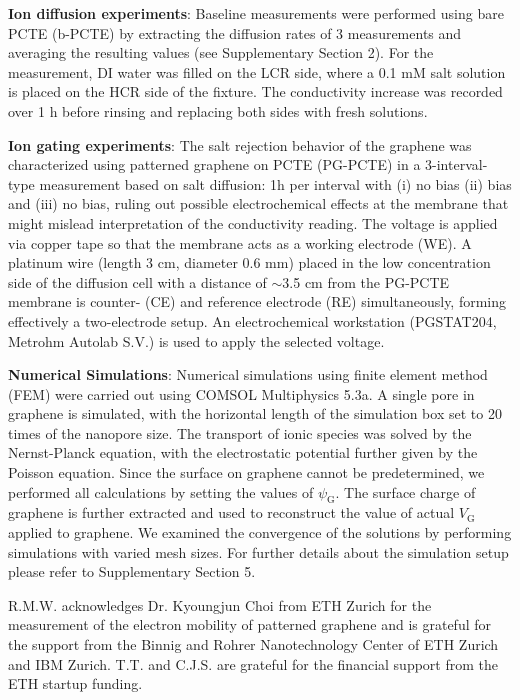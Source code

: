 \documentclass[journal=langd5,email=true, hyperref=true, keywords=false]{achemso}
\begin{document}
\vspace{1em}
\noindent
\textbf{Ion diffusion experiments}: Baseline measurements were
performed using bare PCTE (b-PCTE) by extracting the diffusion rates
of 3 measurements and averaging the resulting values (see
Supplementary Section 2). For the measurement, DI water was filled on
the LCR side, where a 0.1 mM salt solution is placed on the HCR side
of the fixture. The conductivity increase was recorded over 1 h before
rinsing and replacing both sides with fresh solutions.

\vspace{1em}
\noindent
\textbf{Ion gating experiments}: The salt rejection behavior of the graphene
was characterized using patterned graphene on PCTE (PG-PCTE) in a
3-interval-type measurement based on salt diffusion: 1h per interval
with (i) no bias (ii) bias and (iii) no bias, ruling out possible
electrochemical effects at the membrane that might mislead
interpretation of the conductivity reading. The voltage is applied via
copper tape so that the membrane acts as a working electrode (WE). A
platinum wire (length 3 cm, diameter 0.6 mm) placed in the low
concentration side of the diffusion cell with a distance of $\sim$3.5 cm
from the PG-PCTE membrane is counter- (CE) and reference electrode
(RE) simultaneously, forming effectively a two-electrode setup. An
electrochemical workstation (PGSTAT204, Metrohm Autolab S.V.) is used
to apply the selected voltage.

\vspace{1em}
\noindent
\textbf{Numerical Simulations}: Numerical simulations using finite
element method (FEM) were carried out using COMSOL Multiphysics
5.3a. A single pore in graphene is simulated, with the horizontal
length of the simulation box set to 20 times of the nanopore size. The
transport of ionic species was solved by the Nernst-Planck equation,
with the electrostatic potential further given by the Poisson
equation. Since the surface on graphene cannot be predetermined, we
performed all calculations by setting the values of
$\psi_{\mathrm{G}}$. The surface charge of graphene is further
extracted and used to reconstruct the value of actual $V_{\mathrm{G}}$
applied to graphene. We examined the convergence of the solutions by
performing simulations with varied mesh sizes. For further details
about the simulation setup please refer to Supplementary Section 5.


\begin{acknowledgement}
  R.M.W. acknowledges Dr. Kyoungjun Choi from ETH Zurich for the measurement of the electron mobility 
  of patterned graphene and is grateful for the support from the Binnig and Rohrer
  Nanotechnology Center of ETH Zurich and IBM Zurich. T.T. and
  C.J.S. are grateful for the financial support from the ETH startup
  funding. 
\end{acknowledgement}
\end{document}
